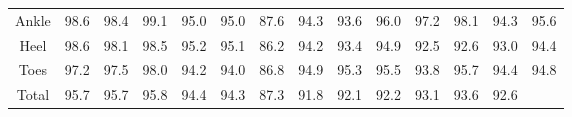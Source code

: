 \documentclass{beamer}
\begin{document}
\begin{frame}
\begin{table}[htbp]
{\begin{adjustbox}{center}
\begin{tabular}{c||ccc|ccc|ccc|ccc|c}
                    Ankle & 98.6 & 98.4 & 99.1 & 95.0 & 95.0 & 87.6 & 94.3 & 93.6 & 96.0 & 97.2 & 98.1 & 94.3 & 95.6 \\
                    Heel & 98.6 & 98.1 & 98.5 & 95.2 & 95.1 & 86.2 & 94.2 & 93.4 & 94.9 & 92.5 & 92.6 & 93.0 & 94.4 \\
                    Toes & 97.2 & 97.5 & 98.0 & 94.2 & 94.0 & 86.8 & 94.9 & 95.3 & 95.5 & 93.8 & 95.7 & 94.4 & 94.8 \\
                    \hline
                    Total & 95.7 & 95.7 & 95.8 & 94.4 & 94.3 & 87.3 & 91.8 & 92.1 & 92.2 & 93.1 & 93.6 & 92.6 & \\
                    \hline
                \end{tabular}
            \end{adjustbox}
        }
    \end{table}
\end{frame}
\end{document}
